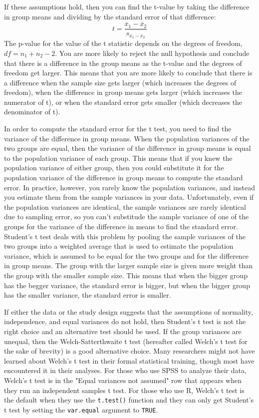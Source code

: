 \documentclass[man,a4paper,noextraspace,apacite]{apa6}
\begin{document}
If these assumptions hold, then you can find the t-value by taking the difference in group means and dividing by the standard error of that difference:   
    \begin{equation}
    t = \frac{\overline{x}_1-\overline{x}_2}{s_{\overline{x}_1-\overline{x}_2}}
    \end{equation}
    The p-value for the value of the t statistic depends on the degrees of freedom, $df=n_1+n_2-2$. You are more likely to reject the null hypothesis and conclude that there is a difference in the group means as the t-value and the degrees of freedom get larger. This means that you are more likely to conclude that there is a difference when the sample size gets larger (which increases the degrees of freedom), when the difference in group means gets larger (which increases the numerator of t), or when the standard error gets smaller (which decreases the denominator of t). 
    
    In order to compute the standard error for the t test, you need to find the variance of the difference in group means. When the population variances of the two groups are equal, then the  variance of the difference in group means is equal to the population variance of each group. This means that if you knew the population variance of either group, then you could substitute it for the population variance of the difference in group means to compute the standard error. In practice, however, you rarely know the population variances, and instead you estimate them from the sample variances in your data. Unfortunately, even if the population variances are identical, the sample variances are rarely identical due to sampling error, so you can't substitude the sample variance of one of the groups for the variance of the difference in means to find the standard error. Student's t test deals with this problem by pooling the sample variances of the two groups into a weighted average that is used to estimate the population variance, which is assumed to be equal for the two groups and for the difference in group means. The group with the larger sample size is given more weight than the group with the smaller sample size. This means that when the bigger group has the begger variance, the standard error is bigger, but when the bigger group has the smaller variance, the standard error is smaller.

    If either the data or the study design suggests that the assumptions of normality, independence, and equal variances do not hold, then Student's t test is not the right choice and an alternative test should be used. If the group variances are unequal, then the Welch-Satterthwaite t test (hereafter called Welch's t test for the sake of brevity) is a good alternative choice. Many researchers might not have learned about Welch's t test in their formal statistical training, though most have encountered it in their analyses. For those who use SPSS to analyze their data, Welch's t test is in the "Equal variances not assumed" row that appears when they run an independent samples t test. For those who use R, Welch's t test is the default when they use the \texttt{t.test()} function and they can only get Student's t test by setting the \texttt{var.equal} argument to \texttt{TRUE}.
    
\end{document}

